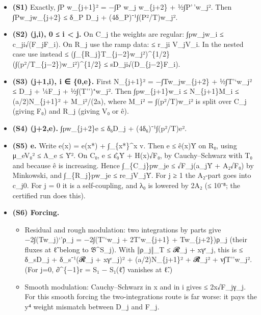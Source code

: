 \documentclass[
]{article}
\providecommand{\tightlist}{%
  \setlength{\itemsep}{0pt}\setlength{\parskip}{0pt}}
\begin{document}
\begin{itemize}
\tightlist
\item
  \textbf{(S1)} Exactly, ∫P w\_\{j+1\}² = −∫P w\_j w\_\{j+2\} +
  ½∫P'\,'w\_j². Then \textbar∫Pw\_jw\_\{j+2\}\textbar{} ≤ δ\_P D\_j +
  (4δ\_P)⁻¹∫(P²/T)w\_j².
\item
  \textbf{(S2) (j,i), 0 ≤ i \textless{} j.} On C\_j the weights are
  regular: ∫\textbar p\textbar\textbar w\_jw\_i\textbar{} ≤
  c\_ji√(F\_jF\_i). On R\_j use the ramp data: ≤ r\_ji V\_jV\_i. In the
  nested case use instead ≤
  (∫\_\{R\_j\}T\_\{j−2\}w\_j²)\^{}\{1/2\}(∫(p²/T\_\{j−2\})w\_i²)\^{}\{1/2\}
  ≤ sD\_ji√(D\_\{j−2\}F\_i).
\item
  \textbf{(S3) (j+1,i), i ∈ \{0,e\}.} First N\_\{j+1\}² =
  −∫Tw\_jw\_\{j+2\} + ½∫T'`w\_j² ≤ D\_j + ¼F\_j + ½∫(T'')⁺w\_j². Then
  \textbar∫pw\_\{j+1\}w\_i\textbar{} ≤ N\_\{j+1\}M\_i ≤ (a/2)N\_\{j+1\}²
  + M\_i²/(2a), where M\_i² = ∫(p²/T)w\_i² is split over C\_j (giving
  F₀) and R\_j (giving V₀ or ê).
\item
  \textbf{(S4) (j+2,e).} \textbar∫pw\_\{j+2\}e\textbar{} ≤ δ₆D\_j +
  (4δ₆)⁻¹∫(p²/T)e².
\item
  \textbf{(S5) e.} Write e(x) = e(x*) + ∫\_\{x*\}\^{}x v. Then
  \textbar e\textbar{} ≤ ê(x)Ȳ on R₀, using μ\_eV₀² ≤ Λ\_e ≤ Ȳ². On C₀,
  \textbar e\textbar{} ≤ ε̂₀Ȳ + H(x)√F₀, by Cauchy--Schwarz with T₀ and
  because ê is increasing. Hence
  ∫\_\{C\_j\}\textbar p\textbar\textbar w\_j\textbar\textbar e\textbar{}
  ≤ √F\_j(a\_jȲ + A₂√F₀) by Minkowski, and
  ∫\_\{R\_j\}\textbar p\textbar\textbar w\_j\textbar\textbar e\textbar{}
  ≤ re\_jV\_jȲ. For j ≥ 1 the A₂-part goes into c\_j0. For j = 0 it is a
  self-coupling, and λ₀ is lowered by 2A₂ (≤ 10⁻⁸; the certified run
  does this).
\item
  \textbf{(S6) Forcing.}

  \begin{itemize}
  \tightlist
  \item
    Residual and rough modulation: two integrations by parts give
    −2∫(Tw\_j)`'ρ\_j = −2∫(T'`w\_j + 2T'w\_\{j+1\} + Tw\_\{j+2\})ρ\_j
    (their fluxes at ℓ̃ belong to 𝔅\^{}S\_j). With ‖ρ\_j‖\_T ≤ 𝓡\_j +
    \textbar x\textbar γʳ\_j, this is ≤ δ\_sD\_j + δ\_s⁻¹(𝓡\_j +
    \textbar x\textbar γʳ\_j)² + (a/2)N\_\{j+1\}² + 𝓡̂\_j² +
    ν∫\textbar T''\textbar w\_j². (For j=0, ∂\^{}\{−1\}r = S₁ − S₁(ℓ̃)
    vanishes at ℓ̃.)
  \item
    Smooth modulation: Cauchy--Schwarz in x and in i gives ≤
    2\textbar x\textbar√F\_jγ\_j. For this smooth forcing the
    two-integrations route is far worse: it pays the y⁴ weight mismatch
    between D\_j and F\_j.
  \end{itemize}
\end{itemize}
\end{document}
